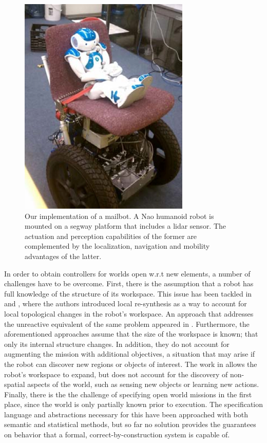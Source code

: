 \begin{figure}[ht]
	\centering
	\includegraphics[width=0.7\columnwidth, clip]{./img/pr3.jpg}
	\caption{Our implementation of a mailbot. A Nao humanoid robot is mounted on a segway platform that includes a lidar sensor. The actuation and perception capabilities of the former are complemented by the localization, navigation and mobility advantages of the latter.}
	\label{Fig:pr3}
\end{figure}

In order to obtain controllers for worlds open w.r.t new elements, a number of challenges have to be overcome. 
First, there is the assumption that a robot has full knowledge of the structure of its workspace. This issue has been tackled in \cite{MurrayICRA2012} and \cite{MurrayICRA2013a}, where the authors introduced local re-synthesis as a way to account for local topological changes in the robot's workspace. 
An approach that addresses the unreactive equivalent of the same problem appeared in \cite{Dimos2013ICRA}. 
Furthermore, the aforementioned approaches assume that the size of the workspace is known; that only its internal structure changes. In addition, they do not account for augmenting the mission with additional objectives, a situation that may arise if the robot can discover new regions or objects of interest. 
The work in \cite{BingxinRSS2012} allows the robot's workspace to expand, but does not account for the discovery of non-spatial aspects of the world, such as sensing new objects or learning new actions.
Finally, there is the the challenge of specifying open world missions in the first place, since the world is only partially known prior to execution. The specification language and abstractions necessary for this have been approached with both semantic \cite{Joshi2012, MatthiasAI2010} and statistical \cite{Tellex2011} methods, but so far no solution provides the guarantees on behavior that a formal, correct-by-construction system is capable of. 

